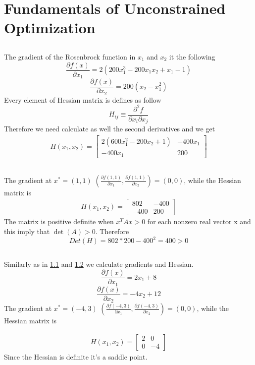 \documentclass[12pt]{article}
\begin{document}
\section{Fundamentals of Unconstrained Optimization}
\subsection{}
\label{1a}
The gradient of the Rosenbrock function in $x_1$ and $x_2$ it the following
\begin{equation}
\frac{\partial f(x)}{\partial x_1} = 2(200x_1^{3} - 200x_1x_2+x_1-1) 
\end{equation}
\begin{equation}
\frac{\partial f(x)}{\partial x_2} = 200(x_2 - x_1^2)
\end{equation}
Every element of Hessian matrix is defines as follow
\begin{equation}
 H_{ij} \equiv \frac{\partial^{2} f}{\partial x_{i} \partial x_{j} }
\end{equation}
Therefore we need calculate as well the second derivatives and we get
\begin{align}
H(x_1,x_2) = \begin{bmatrix}
2(600x_1^2-200x_2+1) & -400x_1 \\
-400x_1 & 200
\end{bmatrix}
\end{align}
\subsection{}
\label{1b}
The gradient at $x^* = (1,1)$ $(\frac{\partial f(1,1)}{\partial x_1}, \frac{\partial f(1,1)}{\partial x_2})  = (0,0)$, while the Hessian matrix is
\begin{align}
H(x_1,x_2) = \begin{bmatrix}
802 & -400 \\
-400 & 200
\end{bmatrix}
\end{align}
The matrix is positive definite when $x^TAx >0$ for each nonzero real vector x and this imply that $\det(A) > 0$. Therefore
\begin{equation}
Det(H) = 802*200-400^2 = 400 > 0
\end{equation}
\subsection{}
Similarly as in \ref{1a} and \ref{1b} we calculate gradients and Hessian.
\begin{equation}
\frac{\partial f(x)}{\partial x_1} = 2x_1 + 8
\end{equation}
\begin{equation}
\frac{\partial f(x)}{\partial x_2} = -4x_2+12
\end{equation}
The gradient at $x^* = (-4,3)$ $(\frac{\partial f(-4,3)}{\partial x_1}, \frac{\partial f(-4,3)}{\partial x_2})  = (0,0)$, while the Hessian matrix is


\begin{align}
H(x_1,x_2) = \begin{bmatrix}
2 & 0 \\
0 & -4
\end{bmatrix}
\end{align}
Since the Hessian is definite it's a saddle point.
\end{document}
